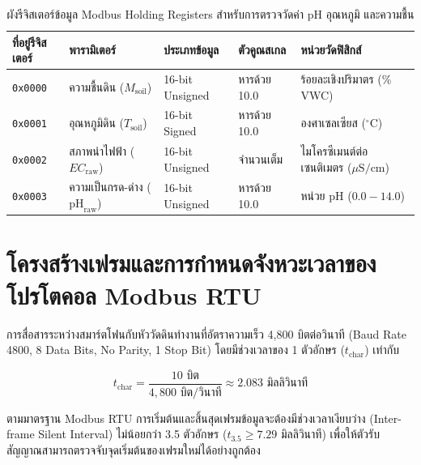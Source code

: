 \begin{table}[H]
\centering
\caption{ผังรีจิสเตอร์ข้อมูล Modbus Holding Registers สำหรับการตรวจวัดค่า pH อุณหภูมิ และความชื้น}
\label{tab:modbus_ph_registers}
\begin{tabularx}{\textwidth}{p{2.5cm}p{2.2cm}p{2.5cm}p{2.2cm}Y}
    \toprule
    \textbf{ที่อยู่รีจิสเตอร์} & \textbf{พารามิเตอร์} & \textbf{ประเภทข้อมูล} & \textbf{ตัวคูณสเกล} & \textbf{หน่วยวัดฟิสิกส์} \\
    \midrule
    \texttt{0x0000} & ความชื้นดิน ($M_{\text{soil}}$) & 16-bit Unsigned & หารด้วย 10.0 & ร้อยละเชิงปริมาตร (\% VWC) \\
    \texttt{0x0001} & อุณหภูมิดิน ($T_{\text{soil}}$) & 16-bit Signed & หารด้วย 10.0 & องศาเซลเซียส ($^\circ\text{C}$) \\
    \texttt{0x0002} & สภาพนำไฟฟ้า ($EC_{\text{raw}}$) & 16-bit Unsigned & จำนวนเต็ม & ไมโครซีเมนต์ต่อเซนติเมตร ($\mu\text{S/cm}$) \\
    \texttt{0x0003} & ความเป็นกรด-ด่าง ($\text{pH}_{\text{raw}}$) & 16-bit Unsigned & หารด้วย 10.0 & หน่วย pH ($0.0 - 14.0$) \\
    \bottomrule
\end{tabularx}
\end{table}

\section{โครงสร้างเฟรมและการกำหนดจังหวะเวลาของโปรโตคอล Modbus RTU}

การสื่อสารระหว่างสมาร์ตโฟนกับหัววัดดินทำงานที่อัตราความเร็ว 4,800 บิตต่อวินาที (Baud Rate 4800, 8 Data Bits, No Parity, 1 Stop Bit) โดยมีช่วงเวลาของ 1 ตัวอักษร ($t_{\text{char}}$) เท่ากับ

\begin{equation}
t_{\text{char}} = \frac{10 \text{ บิต}}{4,800 \text{ บิต/วินาที}} \approx 2.083 \text{ มิลลิวินาที}
\end{equation}

ตามมาตรฐาน Modbus RTU การเริ่มต้นและสิ้นสุดเฟรมข้อมูลจะต้องมีช่วงเวลาเงียบว่าง (Inter-frame Silent Interval) ไม่น้อยกว่า 3.5 ตัวอักษร ($t_{3.5} \ge 7.29 \text{ มิลลิวินาที}$) เพื่อให้ตัวรับสัญญาณสามารถตรวจจับจุดเริ่มต้นของเฟรมใหม่ได้อย่างถูกต้อง

